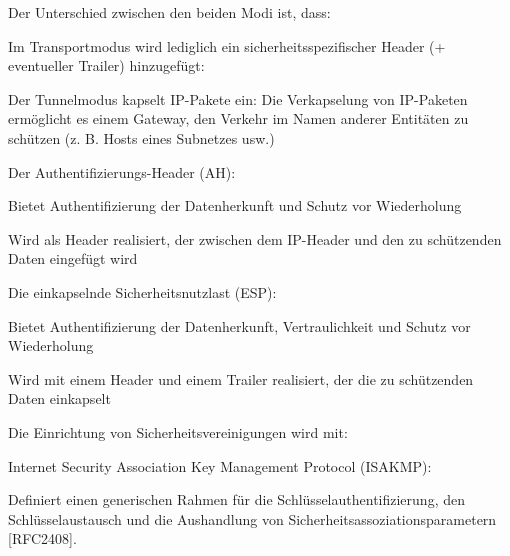 \documentclass[a4paper]{article}
\begin{document}
\begin{multicols}{3}
      Der Unterschied zwischen den beiden Modi ist, dass:

      Im Transportmodus wird lediglich ein sicherheitsspezifischer Header (+ eventueller Trailer) hinzugefügt:
      \begin{itemize*} %
            \item Der Tunnelmodus kapselt IP-Pakete ein: Die Verkapselung von IP-Paketen ermöglicht es einem Gateway, den Verkehr im Namen anderer Entitäten zu schützen (z. B. Hosts eines Subnetzes usw.)
            \item Der Authentifizierungs-Header (AH):
            \begin{itemize*}
                  \item Bietet Authentifizierung der Datenherkunft und Schutz vor Wiederholung
                  \item Wird als Header realisiert, der zwischen dem IP-Header und den zu schützenden Daten eingefügt wird
            \end{itemize*}
            \item Die einkapselnde Sicherheitsnutzlast (ESP):
            \begin{itemize*}
                  \item Bietet Authentifizierung der Datenherkunft, Vertraulichkeit und Schutz vor Wiederholung
                  \item Wird mit einem Header und einem Trailer realisiert, der die zu schützenden Daten einkapselt
            \end{itemize*}
            \item Die Einrichtung von Sicherheitsvereinigungen wird mit:
            \begin{itemize*}
                  \item Internet Security Association Key Management Protocol (ISAKMP):
                  \begin{itemize*}
                        \item Definiert einen generischen Rahmen für die Schlüsselauthentifizierung, den Schlüsselaustausch und die Aushandlung von Sicherheitsassoziationsparametern {[}RFC2408{]}.

\end{itemize*}
\end{itemize*}
\end{itemize*}
\end{multicols}
\end{document}

